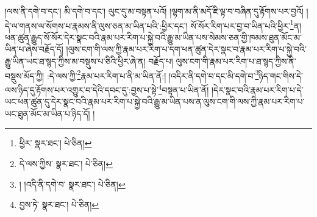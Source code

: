 །ལས་ནི་དགེ་བ་དང་། མི་དགེ་བ་དང་། ལུང་དུ་མ་བསྟན་པའོ། །ལྷག་མ་ནི་མདོ་ཇི་ལྟ་བ་བཞིན་དུ་རྟོགས་པར་བྱའོ། །དེ་ལ་གནས་ལ་སོགས་པ་རྣམས་ནི་ལུས་ཅན་མ་ཡིན་པའི་:ཕྱིར་དང་། སོ་སོར་རིག་པར་བྱ་བ་ཡིན་པའི་ཕྱིར་\footnote{ཕྱིར་  སྣར་ཐང་།  པེ་ཅིན། }ན། ཕན་ཚུན་རྒྱུད་སོ་སོར་དེར་སྣང་བའི་རྣམ་པར་རིག་པ་སྐྱེ་བའི་རྒྱུ་མ་ཡིན་པས་སེམས་ཅན་གྱི་ཁམས་ཐུན་མོང་མ་ཡིན་པ་ཞེས་བརྗོད་དོ། །ལུས་ངག་གི་ལས་ཀྱི་རྣམ་པར་རིག་པ་དག་ཕན་ཚུན་དེར་སྣང་བ་རྣམ་པར་རིག་པ་སྐྱེ་བའི་རྒྱུ་ཡིན་ཡང་ཐ་སྙད་ཀྱིས་མ་བསྡུས་པ་ཅིའི་ཕྱིར་ཞེ་ན། བརྗོད་པ། ལུས་ངག་གི་རྣམ་པར་རིག་པ་ཐ་སྙད་ཀྱིས་ནི་བསྡུས་མོད་ཀྱི། :དེ་ལས་ཀྱི་\footnote{དེ་ལས་ཀྱིས་  སྣར་ཐང་།  པེ་ཅིན། }རྣམ་པར་རིག་པ་ནི་མ་ཡིན་ནོ:། །འདིར་ནི་དགེ་བ་དང་མི་དགེ་བ་\footnote{། །འདི་ནི་དགེ་བ་  སྣར་ཐང་།  པེ་ཅིན། }ཉིད་གང་གིས་དེ་ལས་ཉིད་དུ་རྟོགས་པར་འགྱུར་བ་དེའི་དབང་དུ་:བྱས་པ་སྟེ་\footnote{བྱས་ཏེ་  སྣར་ཐང་།  པེ་ཅིན། }བསྟན་པ་ཡིན་ནོ། །དེར་སྣང་བའི་རྣམ་པར་རིག་པ་དེ་ཡང་ཕན་ཚུན་དུ་དེར་སྣང་བའི་རྣམ་པར་རིག་པ་སྐྱེ་བའི་རྒྱུ་མ་ཡིན་པས་ན་ལུས་ངག་གི་ལས་ཀྱི་རྣམ་པར་རིག་པ་ཡང་ཐུན་མོང་མ་ཡིན་པ་ཉིད་དོ། །
